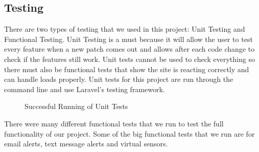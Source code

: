 \documentclass{report}
\begin{document}
\subsection*{Testing}
\indent
\indent
There are two types of testing that we used in this project: Unit Testing and Functional Testing. Unit Testing is a must because it will allow the user to test every feature when a new patch comes out and allows after each code change to check if the features still work. Unit tests cannot be used to check everything so there must also be functional tests that show the site is reacting correctly and can handle loads properly.
\newline
\indent
Unit tests for this project are run through the command line and use Laravel's testing framework. 
\begin{figure}[H]
	\caption{Successful Running of Unit Tests}
\end{figure}
\indent
There were many different functional tests that we run to test the full functionality of our project. Some of the big functional tests that we run are for email alerts, text message alerts and virtual sensors.
\end{document}
